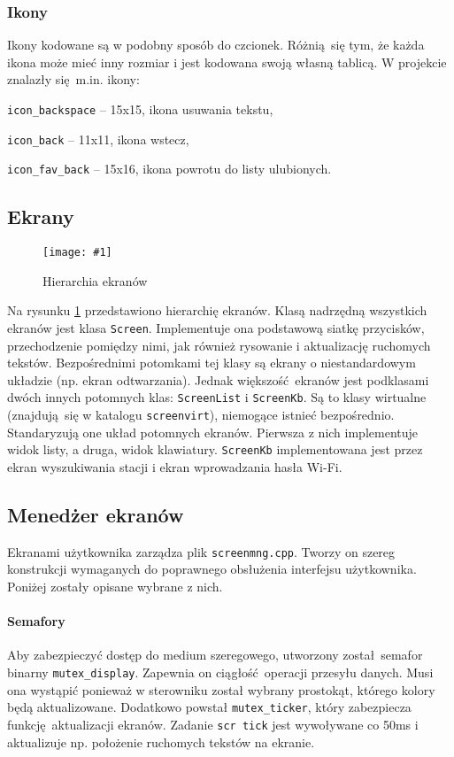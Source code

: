 \documentclass[polish]{aghengthesis}
\let\tempone\itemize
\let\temptwo\enditemize
\renewenvironment{itemize}{\tempone\setlength{\itemsep}{0cm}}{\temptwo}
\newcommand{\imgint}[4]{
	\begin{figure}[{#4}]
		\centering
		\texttt{[image: \#1]}
		\caption{#2}
		\label{#1}
	\end{figure}
}
\newcommand{\imgh}[3]{\imgint{#1}{#2}{#3}{H}}
\begin{document}
			\subsubsection{Ikony}
				Ikony kodowane są w podobny sposób do czcionek. Różnią się tym, że każda ikona może mieć inny rozmiar i jest kodowana swoją własną tablicą. W projekcie znalazły się m.in. ikony:
				\begin{itemize}
					\item \lstinline|icon_backspace| -- 15x15, ikona usuwania tekstu,
					\item \lstinline|icon_back| -- 11x11, ikona wstecz,
					\item \lstinline|icon_fav_back| -- 15x16, ikona powrotu do listy ulubionych.
				\end{itemize}
		
		\subsection{Ekrany}
			\imgh{3/PicoRadio-screens}{Hierarchia ekranów}{0.55} %
			Na rysunku \ref{3/PicoRadio-screens} przedstawiono hierarchię ekranów. Klasą nadrzędną wszystkich ekranów jest klasa \lstinline|Screen|. Implementuje ona podstawową siatkę przycisków, przechodzenie pomiędzy nimi, jak również rysowanie i aktualizację ruchomych tekstów. Bezpośrednimi potomkami tej klasy są ekrany o niestandardowym układzie (np. ekran odtwarzania). Jednak większość ekranów jest podklasami dwóch innych potomnych klas: \lstinline|ScreenList| i \lstinline|ScreenKb|. Są to klasy wirtualne (znajdują się w katalogu \lstinline|screenvirt|), niemogące istnieć bezpośrednio. Standaryzują one układ potomnych ekranów. Pierwsza z nich implementuje widok listy, a druga, widok klawiatury. \lstinline|ScreenKb| implementowana jest przez ekran wyszukiwania stacji i ekran wprowadzania hasła Wi-Fi.
			
		\subsection{Menedżer ekranów}
			Ekranami użytkownika zarządza plik \lstinline|screenmng.cpp|. Tworzy on szereg konstrukcji wymaganych do poprawnego obsłużenia interfejsu użytkownika. Poniżej zostały opisane wybrane z nich.
			
			\paragraph{Semafory}
				Aby zabezpieczyć dostęp do medium szeregowego, utworzony został semafor binarny \lstinline|mutex_display|. Zapewnia on ciągłość operacji przesyłu danych. Musi ona wystąpić ponieważ w sterowniku został wybrany prostokąt, którego kolory będą aktualizowane. Dodatkowo powstał \lstinline|mutex_ticker|, który zabezpiecza funkcję aktualizacji ekranów. Zadanie \lstinline|scr tick| jest wywoływane co 50ms i aktualizuje np. położenie ruchomych tekstów na ekranie.
				
\end{document}
